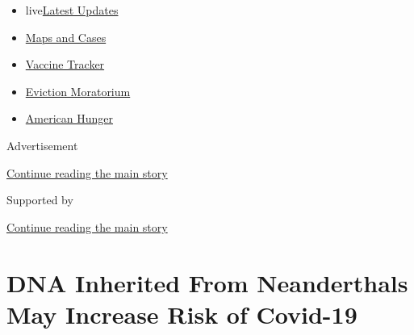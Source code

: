 \begin{itemize}
\tightlist
\item
  live\href{https://www.nytimes3xbfgragh.onion/2020/09/05/world/coronavirus-covid.html?name=styln-coronavirus-national\&region=TOP_BANNER\&block=storyline_menu_recirc\&action=click\&pgtype=Article\&impression_id=4e7d9531-efba-11ea-bf6c-d9d97a131239\&variant=undefined}{Latest
  Updates}
\item
  \href{https://www.nytimes3xbfgragh.onion/interactive/2020/us/coronavirus-us-cases.html?name=styln-coronavirus-national\&region=TOP_BANNER\&block=storyline_menu_recirc\&action=click\&pgtype=Article\&impression_id=4e7d9532-efba-11ea-bf6c-d9d97a131239\&variant=undefined}{Maps
  and Cases}
\item
  \href{https://www.nytimes3xbfgragh.onion/interactive/2020/science/coronavirus-vaccine-tracker.html?name=styln-coronavirus-national\&region=TOP_BANNER\&block=storyline_menu_recirc\&action=click\&pgtype=Article\&impression_id=4e7d9533-efba-11ea-bf6c-d9d97a131239\&variant=undefined}{Vaccine
  Tracker}
\item
  \href{https://www.nytimes3xbfgragh.onion/2020/09/02/your-money/eviction-moratorium-covid.html?name=styln-coronavirus-national\&region=TOP_BANNER\&block=storyline_menu_recirc\&action=click\&pgtype=Article\&impression_id=4e7dbc40-efba-11ea-bf6c-d9d97a131239\&variant=undefined}{Eviction
  Moratorium}
\item
  \href{https://www.nytimes3xbfgragh.onion/interactive/2020/09/02/magazine/food-insecurity-hunger-us.html?name=styln-coronavirus-national\&region=TOP_BANNER\&block=storyline_menu_recirc\&action=click\&pgtype=Article\&impression_id=4e7dbc41-efba-11ea-bf6c-d9d97a131239\&variant=undefined}{American
  Hunger}
\end{itemize}

Advertisement

\protect\hyperlink{after-top}{Continue reading the main story}

Supported by

\protect\hyperlink{after-sponsor}{Continue reading the main story}

\hypertarget{dna-inherited-from-neanderthals-may-increase-risk-of-covid-19}{%
\section{DNA Inherited From Neanderthals May Increase Risk of
Covid-19}\label{dna-inherited-from-neanderthals-may-increase-risk-of-covid-19}}

